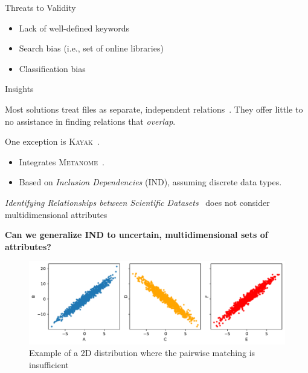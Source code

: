 \documentclass[10pt]{beamer}
\begin{document}
\begin{frame}{Threats to Validity}
\begin{itemize}
    \item Lack of well-defined keywords
    \item Search bias (i.e., set of online libraries)
    \item Classification bias
\end{itemize}
\end{frame}

\begin{frame}{Insights}
    \begin{block}{}
        Most solutions treat files as separate, independent relations~\cite{Silva2016}. They offer
        little to no assistance in finding relations that \textit{overlap}.
    \end{block}
    \begin{block}{}
        One exception is \textsc{Kayak}~\cite{maccioni_crossing_2017}.
        \begin{itemize}
            \item Integrates \textsc{Metanome}~\cite{papenbrock2015data}.
            \item Based on \emph{Inclusion Dependencies} (IND), assuming discrete data types.
        \end{itemize}
    \end{block}
    \begin{block}{}
        \emph{Identifying Relationships between Scientific Datasets}~\cite{alawini2016} does not
        consider multidimensional attributes
    \end{block}
    \alert{\textbf{Can we generalize IND to uncertain, multidimensional sets of attributes?}}
\end{frame}

\begin{frame}{}
\begin{figure}
    \centering
    \includegraphics[width=\textwidth]{no2ind.pdf}
    \caption{Example of a 2D distribution where the pairwise matching is insufficient}
\end{figure}
\end{frame}
\end{document}
